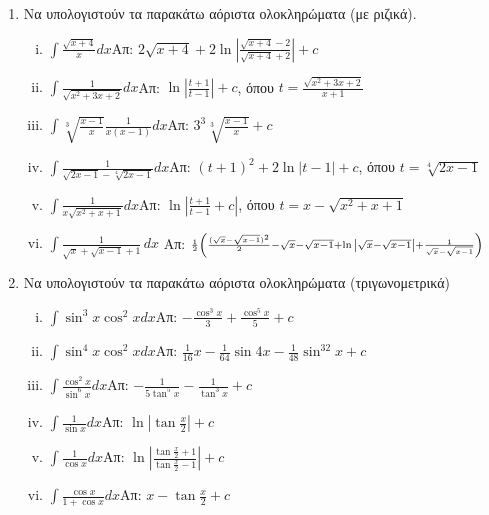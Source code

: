 \documentclass[a4paper,12pt]{article}
\begin{document}
\begin{enumerate}
\item \label{ask:rizes} Να υπολογιστούν τα παρακάτω αόριστα ολοκληρώματα (με ριζικά).

	\begin{enumerate}[i)]
\item $\int\frac{\sqrt{x+4}}{x}dx$\hfill Απ: $2\sqrt{x+4}+2\ln\left|\frac{\sqrt{x+4}-2}{\sqrt{x+4}+2}\right|+c$
\item $\int\frac{1}{\sqrt{x^2+3x+2}}dx$\hfill Απ: $\ln\left|\frac{t+1}{t-1}\right|+c$, όπου $t=\frac{\sqrt{x^2+3x+2}}{x+1}$
\item $\int\sqrt[3]{\frac{x-1}{x}}\frac{1}{x(x-1)}dx$\hfill Απ: $3^3\sqrt[3]{\frac{x-1}{x}} +c$
\item  $\int\frac{1}{\sqrt{2x-1}-\sqrt[4]{2x-1}}dx$\hfill Απ: $(t+1)^2
	+2\ln|t-1|+c$, όπου $t=\sqrt[4]{2x-1} \label{four} $
\item  $\int\frac{1}{x\sqrt{x^2+x+1}}dx$\hfill Απ: $\ln\left|\frac{t+1}{t-1}+c\right|$, όπου $t=x-\sqrt{x^2+x+1}$
\item $ \int \frac{1}{\sqrt{x} + \sqrt{x-1} + 1} \, dx$ \hfill Απ: $
	\scriptstyle{\frac{1}{2} \left(\frac{(\sqrt{x} - \sqrt{x-1})^{2}}{2} -
	\sqrt{x} - \sqrt{x-1} + \ln{\abs{\sqrt{x} - \sqrt{x-1}}} + \frac{1}{\sqrt{x}
- \sqrt{x-1}} \right)} $
\end{enumerate}


\item \label{ask:trig} Να υπολογιστούν τα παρακάτω αόριστα ολοκληρώματα (τριγωνομετρικά)
	\begin{enumerate}[i)]
		\item \label{ex:one} $\int\sin^3x\cos^2xdx$\hfill Απ: $-\frac{\cos^3x}{3}+\frac{\cos^5x}{5}+c$
		\item \label{ex:two} $\int\sin^4x\cos^2xdx$\hfill Απ: $\frac{1}{16}x-\frac{1}{64}\sin 4x-\frac{1}{48}\sin^32x+c$
		\item \label{ex:three} $\int\frac{\cos^2x}{\sin^6x}dx$\hfill Απ: $-\frac{1}{5\tan^5x}-\frac{1}{\tan^3x}+c$
		\item \label{ex:four} $\int\frac{1}{\sin x}dx$\hfill Απ:
			$\ln\left|\tan\frac{x}{2}\right|+c$
		\item \label{ex:five} $\int\frac{1}{\cos x}dx$\hfill Απ:
			$\ln\left|\frac{\tan\frac{x}{2}+1}{\tan\frac{x}{2}-1}\right|+c$
		\item \label{ex:six} $\int\frac{\cos x}{1+\cos x}dx$\hfill Απ: $x-\tan\frac{x}{2}+c$
\end{enumerate}
\end{enumerate}
\end{document}
